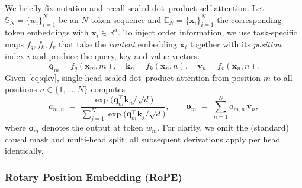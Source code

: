We briefly fix notation and recall scaled dot–product self‑attention.
Let $\mathbb S_N=\{w_i\}_{i=1}^{N}$ be an $N$‑token sequence and
$\mathbb E_N=\{\mathbf x_i\}_{i=1}^{N}$ the corresponding token embeddings with
$\mathbf x_i\in\mathbb R^{d}$.
To inject order information, we use task‑specific maps
$f_q,f_k,f_v$ that take the \emph{content} embedding $\mathbf x_i$ together with its
\emph{position} index $i$ and produce the query, key and value vectors:
\begin{equation}
\label{eq:qkv}
\mathbf q_{m}=f_q(\mathbf x_{m},m),\quad
\mathbf k_{n}=f_k(\mathbf x_{n},n),\quad
\mathbf v_{n}=f_v(\mathbf x_{n},n).
\end{equation}
Given \eqref{eq:qkv}, single‑head scaled dot–product attention from position $m$ to all
positions $n\in\{1,\dots,N\}$ computes
\begin{equation}
\label{eq:attn-weights}
a_{m,n}\;=\;
\frac{\exp\!\bigl(\mathbf q_{m}^{\top}\mathbf k_{n}/\sqrt d\bigr)}
     {\displaystyle\sum_{j=1}^{N}\exp\!\bigl(\mathbf q_{m}^{\top}\mathbf k_{j}/\sqrt d\bigr)},
\qquad
\mathbf o_{m}\;=\;\sum_{n=1}^{N}a_{m,n}\,\mathbf v_{n},
\end{equation}
where $\mathbf o_m$ denotes the output at token $w_m$.
For clarity, we omit the (standard) causal mask and multi‑head split; all subsequent
derivations apply per head identically.

\subsubsection{Rotary Position Embedding (RoPE)}
\label{sec:rope}

